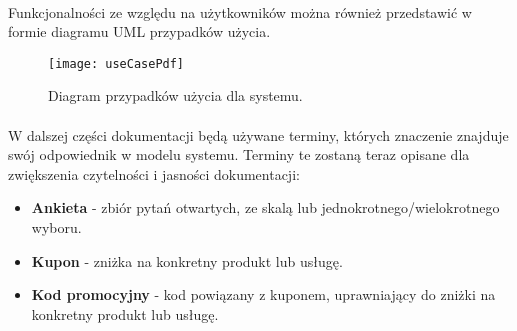 \paragraph{}
Funkcjonalności ze względu na użytkowników można również przedstawić w formie diagramu UML przypadków użycia.
\begin{figure}[h]
\centering
\texttt{[image: useCasePdf]}
\caption{Diagram przypadków użycia dla systemu.}
\end{figure}

\paragraph{}
W dalszej części dokumentacji będą używane terminy, których znaczenie znajduje swój odpowiednik w modelu systemu. Terminy te zostaną teraz opisane dla zwiększenia czytelności i jasności dokumentacji:
\begin{itemize}
\item \textbf{Ankieta} - zbiór pytań otwartych, ze skalą lub jednokrotnego/wielokrotnego wyboru.
\item \textbf{Kupon} - zniżka na konkretny produkt lub usługę.
\item \textbf{Kod promocyjny} - kod powiązany z kuponem, uprawniający do zniżki na konkretny produkt lub usługę.
\end{itemize}
\clearpage